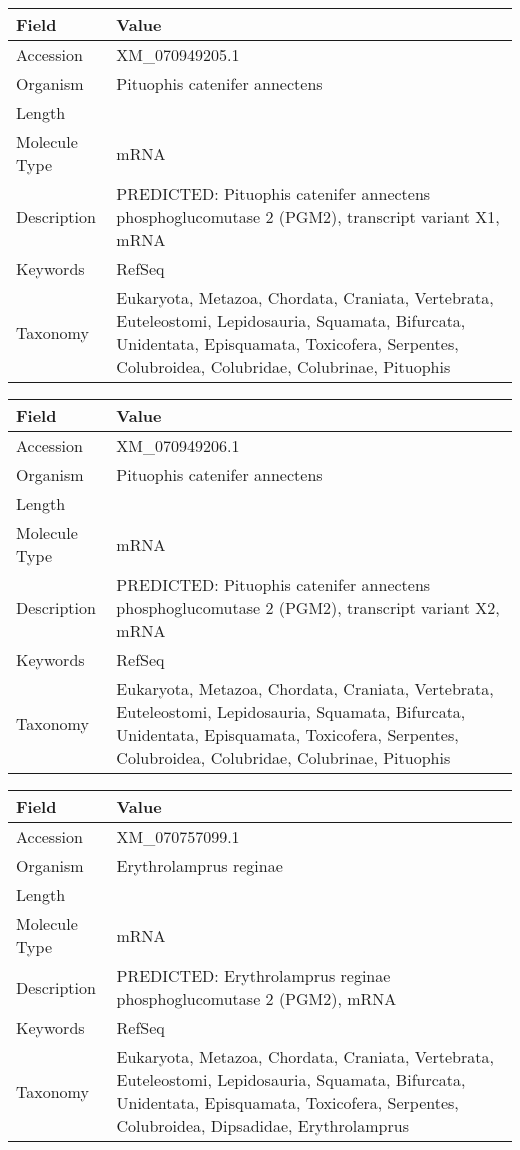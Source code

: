 \documentclass[10pt]{article}
\begin{document}
\vspace{1em}
{\footnotesize
\begin{longtable}{>{\raggedright\arraybackslash}p{4.5cm} >{\raggedright\arraybackslash}p{11.5cm}}
\textbf{Field} & \textbf{Value} \\
\hline
Accession & XM\_070949205.1 \\
Organism & Pituophis catenifer annectens \\
Length & 2030 \\
Molecule Type & mRNA \\
Description & PREDICTED: Pituophis catenifer annectens phosphoglucomutase 2 (PGM2), transcript variant X1, mRNA \\
Keywords & RefSeq \\
Taxonomy & Eukaryota, Metazoa, Chordata, Craniata, Vertebrata, Euteleostomi, Lepidosauria, Squamata, Bifurcata, Unidentata, Episquamata, Toxicofera, Serpentes, Colubroidea, Colubridae, Colubrinae, Pituophis \\
\end{longtable}
}

\vspace{1em}
{\footnotesize
\begin{longtable}{>{\raggedright\arraybackslash}p{4.5cm} >{\raggedright\arraybackslash}p{11.5cm}}
\textbf{Field} & \textbf{Value} \\
\hline
Accession & XM\_070949206.1 \\
Organism & Pituophis catenifer annectens \\
Length & 1892 \\
Molecule Type & mRNA \\
Description & PREDICTED: Pituophis catenifer annectens phosphoglucomutase 2 (PGM2), transcript variant X2, mRNA \\
Keywords & RefSeq \\
Taxonomy & Eukaryota, Metazoa, Chordata, Craniata, Vertebrata, Euteleostomi, Lepidosauria, Squamata, Bifurcata, Unidentata, Episquamata, Toxicofera, Serpentes, Colubroidea, Colubridae, Colubrinae, Pituophis \\
\end{longtable}
}

\vspace{1em}
{\footnotesize
\begin{longtable}{>{\raggedright\arraybackslash}p{4.5cm} >{\raggedright\arraybackslash}p{11.5cm}}
\textbf{Field} & \textbf{Value} \\
\hline
Accession & XM\_070757099.1 \\
Organism & Erythrolamprus reginae \\
Length & 2045 \\
Molecule Type & mRNA \\
Description & PREDICTED: Erythrolamprus reginae phosphoglucomutase 2 (PGM2), mRNA \\
Keywords & RefSeq \\
Taxonomy & Eukaryota, Metazoa, Chordata, Craniata, Vertebrata, Euteleostomi, Lepidosauria, Squamata, Bifurcata, Unidentata, Episquamata, Toxicofera, Serpentes, Colubroidea, Dipsadidae, Erythrolamprus \\
\end{longtable}
}
\end{document}
